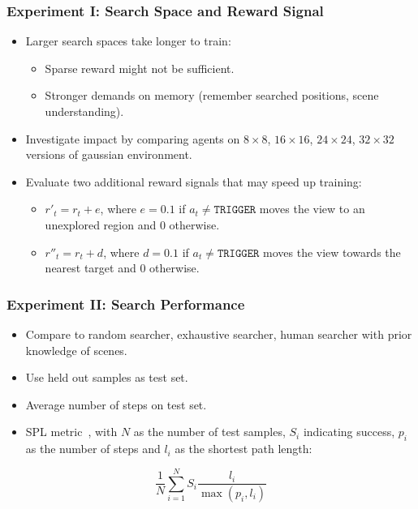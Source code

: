 \begin{frame}
    \frametitle{Experiment I: Search Space and Reward Signal}

    \begin{itemize}
        \item Larger search spaces take longer to train:
        \begin{itemize}
            \item Sparse reward might not be sufficient.
            \item Stronger demands on memory (remember searched positions, scene understanding).
        \end{itemize}
        \item Investigate impact by comparing agents on \(8 \times 8\), \(16 \times 16\), \(24 \times 24\), \(32 \times 32\) versions of gaussian environment.
        \item Evaluate two additional reward signals that may speed up training:
        \begin{itemize}
            \item \(r'_t = r_t + e\), where \(e=0.1\) if \(a_t \neq \mathtt{TRIGGER}\) moves the view to an unexplored region and \(0\) otherwise.
            \item \(r''_t = r_t + d\), where \(d=0.1\) if \(a_t \neq \mathtt{TRIGGER}\) moves the view towards the nearest target and \(0\) otherwise.
        \end{itemize}
    \end{itemize}
\end{frame}

\begin{frame}
    \frametitle{Experiment II: Search Performance}

    \begin{itemize}
        \item Compare to random searcher, exhaustive searcher, human searcher with prior knowledge of scenes.
        \item Use held out samples as test set.
        \item Average number of steps on test set.
        \item SPL metric~\cite{anderson_evaluation_2018}, with \(N\) as the number of test samples, \(S_i\) indicating success, \(p_i\) as the number of steps and \(l_i\) as the shortest path length:
    \end{itemize}
    \[
        \frac{1}{N} \sum_{i=1}^N S_i \frac{l_i}{\max(p_i,l_i)}
    \]
\end{frame}

